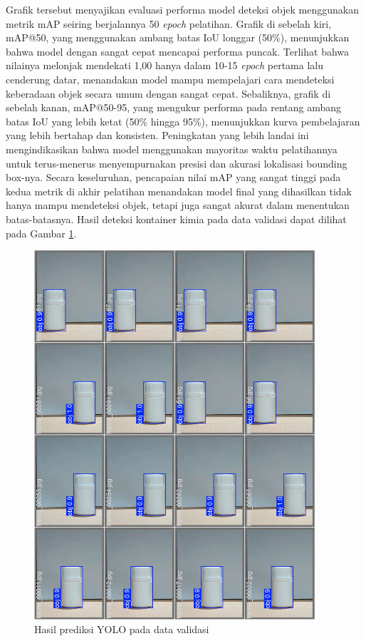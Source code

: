 Grafik tersebut menyajikan evaluasi performa model deteksi objek
menggunakan metrik mAP seiring berjalannya
50 \textit{epoch} pelatihan. Grafik di sebelah kiri, mAP@50, yang menggunakan
ambang batas IoU longgar (50\%), menunjukkan bahwa model dengan
sangat cepat mencapai performa puncak. Terlihat bahwa nilainya
melonjak mendekati 1,00 hanya dalam 10-15 \textit{epoch} pertama lalu
cenderung datar, menandakan model mampu mempelajari cara mendeteksi
keberadaan objek secara umum dengan sangat cepat. Sebaliknya, grafik
di sebelah kanan, mAP@50-95, yang mengukur performa pada rentang
ambang batas IoU yang lebih ketat (50\% hingga 95\%), menunjukkan
kurva pembelajaran yang lebih bertahap dan konsisten. Peningkatan
yang lebih landai ini mengindikasikan bahwa model menggunakan
mayoritas waktu pelatihannya untuk terus-menerus menyempurnakan
presisi dan akurasi lokalisasi bounding box-nya. Secara keseluruhan,
pencapaian nilai mAP yang sangat tinggi pada kedua metrik di akhir
pelatihan menandakan model final yang dihasilkan tidak hanya mampu
mendeteksi objek, tetapi juga sangat akurat dalam menentukan
batas-batasnya. Hasil deteksi kontainer kimia pada data validasi
dapat dilihat pada Gambar \ref{fig:yolo-validasi}.

\begin{figure}[H]
  \centering
  \includegraphics[width=0.93\textwidth]{gambar/yolo_validasi.jpg}
  \caption{Hasil prediksi YOLO pada data validasi}
  \label{fig:yolo-validasi}
\end{figure}
\vspace{-1em}

